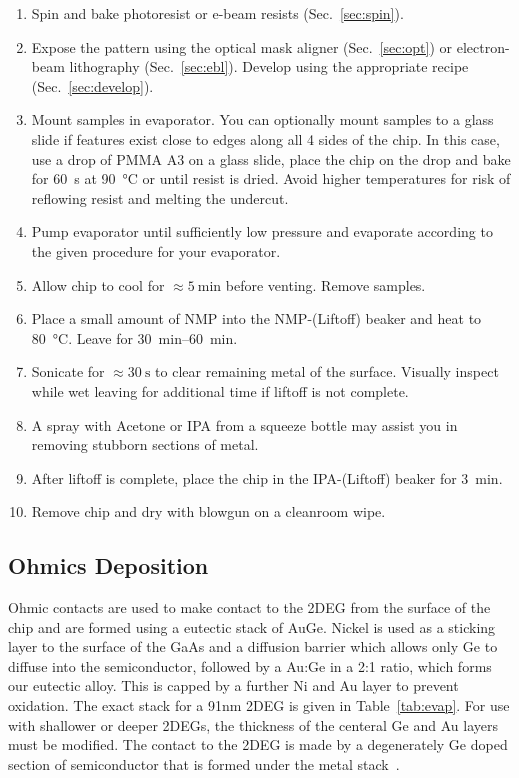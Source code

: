 
\begin{enumerate}
    \item Spin and bake photoresist or e-beam resists (Sec.~\ref{sec:spin}).
    \item Expose the pattern using the optical mask aligner (Sec.~\ref{sec:opt}) or electron-beam lithography (Sec.~\ref{sec:ebl}). Develop using the appropriate recipe (Sec.~\ref{sec:develop}).
    \item Mount samples in evaporator. You can optionally mount samples to a glass slide if features exist close to edges along all 4 sides of the chip. In this case, use a drop of PMMA A3 on a glass slide, place the chip on the drop and bake for \SI{60}{\second} at \SI{90}{\celsius} or until resist is dried. Avoid higher temperatures for risk of reflowing resist and melting the undercut.
    \item Pump evaporator until sufficiently low pressure and evaporate according to the given procedure for your evaporator.
    \item Allow chip to cool for $\approx \SI{5}{\minute}$ before venting. Remove samples.
    \item Place a small amount of NMP into the NMP-(Liftoff) beaker and heat to \SI{80}{\celsius}. Leave for \SIrange{30}{60}{\minute}.
    \item Sonicate for $\approx \SI{30}{\second}$ to clear remaining metal of the surface. Visually inspect while wet leaving for additional time if liftoff is not complete.
    \item A spray with Acetone or IPA from a squeeze bottle may assist you in removing stubborn sections of metal.
    \item After liftoff is complete, place the chip in the IPA-(Liftoff) beaker for \SI{3}{\minute}.
    \item Remove chip and dry with  blowgun on a cleanroom wipe.
\end{enumerate}

\subsection{Ohmics Deposition}
\label{sec:ohmics}
Ohmic contacts are used to make contact to the 2DEG from the surface of the chip and are formed using a eutectic stack
of AuGe. Nickel is used as a sticking layer to the surface of the GaAs and a diffusion barrier which allows only Ge to diffuse
into the semiconductor, followed by a Au:Ge in a 2:1 ratio, which forms our eutectic alloy. This is capped by a further Ni and
Au layer to prevent oxidation. The exact stack for a 91nm 2DEG is given in Table~\ref{tab:evap}. For use with shallower or
deeper 2DEGs, the thickness of the centeral Ge and Au layers must be modified. The contact to the 2DEG is made by a degenerately
Ge doped section of semiconductor that is formed under the metal stack~\cite{RELLING1989380}.

